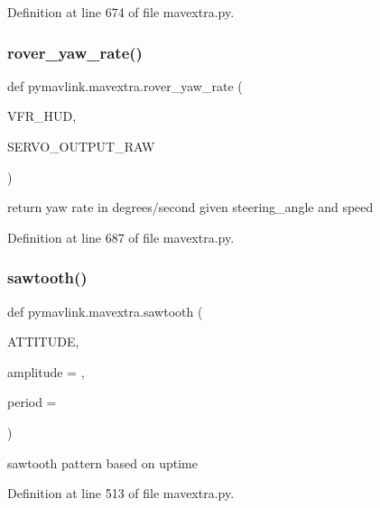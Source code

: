 Definition at line 674 of file mavextra.\+py.

\mbox{\label{namespacepymavlink_1_1mavextra_a06610d38e6694c31c2fdbaafd57eae54}} 
\subsubsection{\texorpdfstring{rover\_yaw\_rate()}{rover\_yaw\_rate()}}
{\footnotesize\ttfamily def pymavlink.\+mavextra.\+rover\+\_\+yaw\+\_\+rate (\begin{DoxyParamCaption}\item[{}]{V\+F\+R\+\_\+\+H\+UD,  }\item[{}]{S\+E\+R\+V\+O\+\_\+\+O\+U\+T\+P\+U\+T\+\_\+\+R\+AW }\end{DoxyParamCaption})}

\begin{DoxyVerb}return yaw rate in degrees/second given steering_angle and speed\end{DoxyVerb}
 

Definition at line 687 of file mavextra.\+py.

\mbox{\label{namespacepymavlink_1_1mavextra_a4a70f6c6e6d7fa829901749b7e3d5546}} 
\subsubsection{\texorpdfstring{sawtooth()}{sawtooth()}}
{\footnotesize\ttfamily def pymavlink.\+mavextra.\+sawtooth (\begin{DoxyParamCaption}\item[{}]{A\+T\+T\+I\+T\+U\+DE,  }\item[{}]{amplitude = {},  }\item[{}]{period = {} }\end{DoxyParamCaption})}

\begin{DoxyVerb}sawtooth pattern based on uptime\end{DoxyVerb}
 

Definition at line 513 of file mavextra.\+py.

